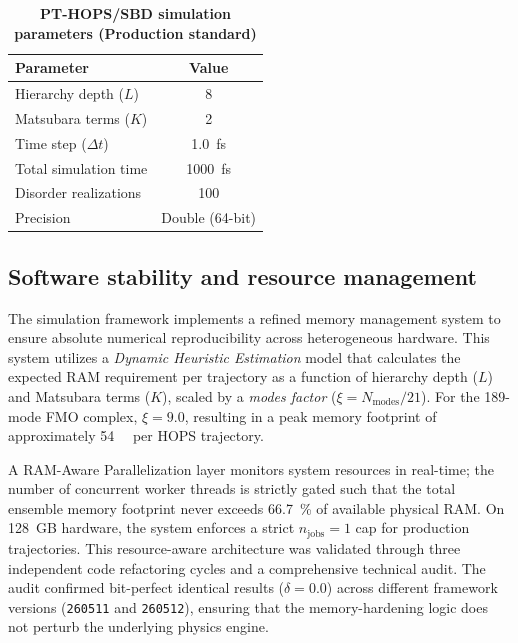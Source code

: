 \documentclass[11pt,a4paper]{article}
\begin{document}
\begin{table}[htb]
\centering
\caption{\textbf{PT-HOPS/SBD simulation parameters (Production standard)}}
\label{tab:SI_parameters}
\begin{tabular}{lc}
\toprule
\textbf{Parameter} & \textbf{Value} \\
\midrule
Hierarchy depth ($L$) & 8 \\
Matsubara terms ($K$) & 2 \\
Time step ($\Delta t$) & \SI{1.0}{\femto\second} \\
Total simulation time & \SI{1000}{\femto\second} \\
Disorder realizations & 100 \\
Precision & Double (64-bit) \\
\bottomrule
\end{tabular}
\end{table}

\subsection{Software stability and resource management}

The simulation framework implements a refined memory management system to ensure absolute numerical reproducibility across heterogeneous hardware. This system utilizes a \textit{Dynamic Heuristic Estimation} model that calculates the expected RAM requirement per trajectory as a function of hierarchy depth ($L$) and Matsubara terms ($K$), scaled by a \textit{modes factor} ($\xi = N_{\mathrm{modes}}/21$). For the 189-mode FMO complex, $\xi = 9.0$, resulting in a peak memory footprint of approximately \SI{54}{\giga\byte} per HOPS trajectory.

A RAM-Aware Parallelization layer monitors system resources in real-time; the number of concurrent worker threads is strictly gated such that the total ensemble memory footprint never exceeds \SI{66.7}{\percent} of available physical RAM. On \SI{128}{GB} hardware, the system enforces a strict $n_{\mathrm{jobs}}=1$ cap for production trajectories. This resource-aware architecture was validated through three independent code refactoring cycles and a comprehensive technical audit. The audit confirmed bit-perfect identical results ($\delta = \num{0.0}$) across different framework versions (\texttt{260511} and \texttt{260512}), ensuring that the memory-hardening logic does not perturb the underlying physics engine.
\end{document}
